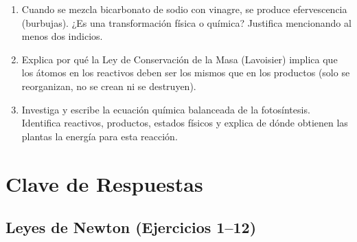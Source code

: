 \documentclass[12pt, a4paper]{article}
\begin{document}
\begin{enumerate}[leftmargin=*, resume]
  \item \dificil{} Cuando se mezcla bicarbonato de sodio con vinagre, se produce efervescencia (burbujas). ¿Es una transformación física o química? Justifica mencionando al menos dos indicios.

  \item \dificil{} Explica por qué la Ley de Conservación de la Masa (Lavoisier) implica que los átomos en los reactivos deben ser los mismos que en los productos (solo se reorganizan, no se crean ni se destruyen).

  \item \dificil{} Investiga y escribe la ecuación química balanceada de la fotosíntesis. Identifica reactivos, productos, estados físicos y explica de dónde obtienen las plantas la energía para esta reacción.
\end{enumerate}

\newpage

\section{Clave de Respuestas}

\subsection*{Leyes de Newton (Ejercicios 1--12)}
\end{document}
